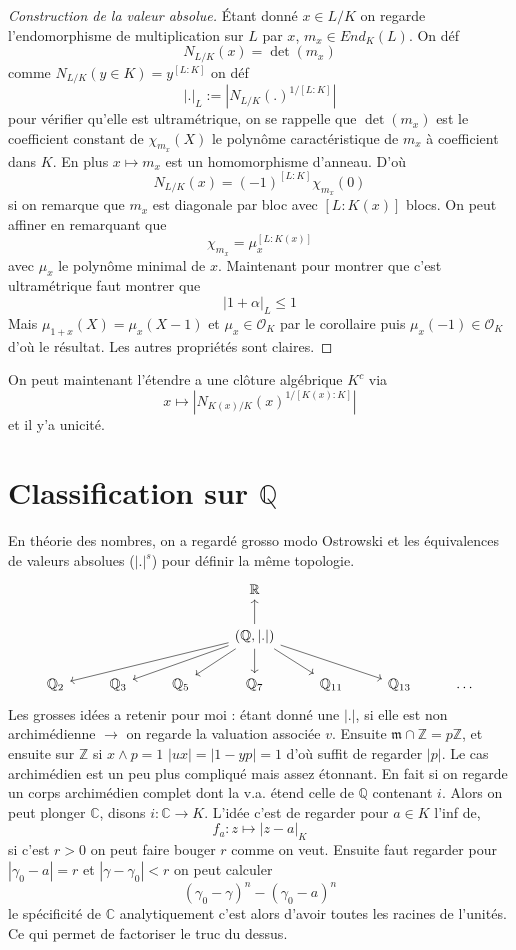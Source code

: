 \documentclass[a4paper,12pt]{book}
\newcommand{\Z}{\mathbb{Z}}
\newcommand{\Q}{\mathbb{Q}}
\newcommand{\C}{\mathbb{C}}
\newcommand{\Or}{\mathcal{O}}
\newcommand{\m}{\mathfrak m}
\theoremstyle{plain}
\theoremstyle{definition}
\theoremstyle{remark}
\begin{document}
\begin{proof}[Construction de la valeur absolue]
    
Étant donné $x\in L/K$ on regarde 
l'endomorphisme de multiplication sur $L$ par $x$, $m_x\in End_K(L)$.
On déf 
\[N_{L/K}(x)=\det(m_x)\]
comme $N_{L/K}(y\in K)=y^{[L:K]}$ on déf 
\[|.|_L:=|N_{L/K}(.)^{1/[L:K]}|\]
pour vérifier qu'elle est ultramétrique, on se rappelle que $\det(m_x)$
est le coefficient constant de $\chi_{m_x}(X)$ le polynôme 
caractéristique de $m_x$ à coefficient dans $K$. En plus 
$x\mapsto m_x$ est un homomorphisme d'anneau. D'où 
\[N_{L/K}(x)=(-1)^{[L:K]}\chi_{m_x}(0)\]
si on remarque que $m_x$ est diagonale par bloc avec $[L:K(x)]$
blocs. On peut affiner en remarquant que 
\[\chi_{m_x}=\mu_{x}^{[L:K(x)]}\]
avec $\mu_x$ le polynôme minimal de $x$. Maintenant pour montrer que
c'est ultramétrique faut montrer que 
\[|1+\alpha|_L\leq 1\]
Mais $\mu_{1+x}(X)=\mu_{x}(X-1)$ et $\mu_x\in \Or_K$ par le corollaire 
puis $\mu_x(-1)\in \Or_K$ d'où le résultat. Les autres propriétés sont
claires.
\end{proof}
On peut maintenant l'étendre a une clôture algébrique $K^c$ via
\[x\mapsto |N_{K(x)/K}(x)^{1/[K(x):K]}|\]
et il y'a unicité.

\section{Classification sur $\Q$}
En théorie des nombres, on a regardé grosso modo Ostrowski et les 
équivalences de valeurs absolues ($|.|^s$) pour définir la même 
topologie.
\[\begin{tikzcd}
	&&& {\mathbb R} \\
	&&& {(\mathbb Q,|.|)} \\
    {\mathbb Q_{2}} & {\mathbb Q_{3}} & {\mathbb Q_{5}} & {\mathbb Q_{7}} & {\mathbb Q_{11}} & {\mathbb Q_{13}} & \ldots
	\arrow[from=2-4, to=1-4]
	\arrow[from=2-4, to=3-1]
	\arrow[from=2-4, to=3-2]
	\arrow[from=2-4, to=3-3]
	\arrow[from=2-4, to=3-4]
	\arrow[from=2-4, to=3-5]
	\arrow[from=2-4, to=3-6]
\end{tikzcd}\]
Les grosses idées a retenir pour moi : étant donné une $|.|$, si
elle est non archimédienne $\to$ on regarde la valuation associée $v$. 
Ensuite $\m\cap \Z=p\Z$, et ensuite sur $\Z$ si $x\wedge p=1$
$|ux|=|1-yp|=1$ d'où suffit de regarder $|p|$. Le cas archimédien est 
un peu plus compliqué mais assez étonnant. En fait si on regarde un corps
archimédien complet dont la v.a. étend celle de $\Q$ contenant $i$.
Alors on peut plonger $\C$, disons $i\colon \C\to K$. L'idée c'est de
regarder pour $a\in K$ l'inf de,
\[f_a\colon z\mapsto |z-a|_K\]
si c'est $r>0$ on peut faire bouger $r$ comme on veut. Ensuite faut 
regarder pour $|\gamma_0 - a|=r$ et $|\gamma - \gamma_0|<r$ on peut 
calculer 
\[(\gamma_0-\gamma)^n - (\gamma_0 - a)^n\]
le spécificité de $\C$ analytiquement c'est alors d'avoir toutes
les racines de l'unités. Ce qui permet de factoriser le truc du dessus.
\end{document}
